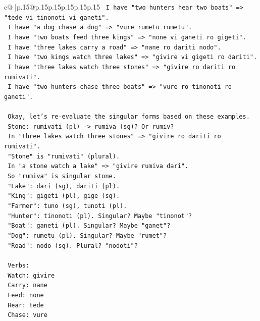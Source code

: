 \documentclass{article}
\begin{document}
{\begin{supertabular}{c@{$\;$}|p{.15\linewidth}@{}p{.15\linewidth}p{.15\linewidth}p{.15\linewidth}p{.15\linewidth}p{.15\linewidth}}
{{{\texttt{   I have "two hunters hear two boats" => "tede vi tinonoti vi ganeti".} \\
\texttt{   I have "a dog chase a dog" => "vure rumetu rumetu".} \\
\texttt{   I have "two boats feed three kings" => "none vi ganeti ro gigeti".} \\
\texttt{   I have "three lakes carry a road" => "nane ro dariti nodo".} \\
\texttt{   I have "two kings watch three lakes" => "givire vi gigeti ro dariti".} \\
\texttt{   I have "three lakes watch three stones" => "givire ro dariti ro rumivati".} \\
\texttt{   I have "two hunters chase three boats" => "vure ro tinonoti ro ganeti".} \\
\\ 
\texttt{   Okay, let's re{-}evaluate the singular forms based on these examples.} \\
\texttt{   Stone: rumivati (pl) {-}> rumiva (sg)? Or rumiv?} \\
\texttt{   In "three lakes watch three stones" => "givire ro dariti ro rumivati".} \\
\texttt{   "Stone" is "rumivati" (plural).} \\
\texttt{   In "a stone watch a lake" => "givire rumiva dari".} \\
\texttt{   So "rumiva" is singular stone.} \\
\texttt{   "Lake": dari (sg), dariti (pl).} \\
\texttt{   "King": gigeti (pl), gige (sg).} \\
\texttt{   "Farmer": tuno (sg), tunoti (pl).} \\
\texttt{   "Hunter": tinonoti (pl). Singular? Maybe "tinonot"?} \\
\texttt{   "Boat": ganeti (pl). Singular? Maybe "ganet"?} \\
\texttt{   "Dog": rumetu (pl). Singular? Maybe "rumet"?} \\
\texttt{   "Road": nodo (sg). Plural? "nodoti"?} \\
\\ 
\texttt{   Verbs:} \\
\texttt{   Watch: givire} \\
\texttt{   Carry: nane} \\
\texttt{   Feed: none} \\
\texttt{   Hear: tede} \\
\texttt{   Chase: vure} \\
}}}
\end{supertabular}}
\end{document}
